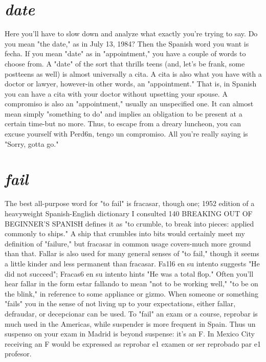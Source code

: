 \section{\emph{date}}

Here you'll have to slow down and analyze what exactly you're
trying to say. Do you mean "the date," as in July 13, 1984? Then the
Spanish word you want is fecha. If you mean "date" as in "appointment," you have a couple of words to choose from. A "date" of the sort
that thrills teens (and, let's be frank, some postteens as well) is almost
universally a cita. A cita is also what you have with a doctor or lawyer, however-in other words, an "appointment." That is, in Spanish
you can have a cita with your doctor without upsetting your spouse. A
compromiso is also an "appointment," usually an unspecified one. It
can almost mean simply "something to do" and implies an obligation
to be present at a certain time-but no more. Thus, to escape from a
dreary luncheon, you can excuse yourself with Perd6n, tengo un compromiso. All you're really saying is "Sorry, gotta go."

\section{\emph{fail}}

The best all-purpose word for "to fail" is fracasar, though one;
1952 edition of a heavyweight Spanish-English dictionary I consulted
140 BREAKING OUT OF BEGINNER'S SPANISH
defines it as "to crumble, to break into pieces: applied commonly to
ships." A ship that crumbles into bits would certainly meet my definition of "failure," but fracasar in common usage covers-much more
ground than that. Fallar is also used for many general senses of "to
fail," though it seems a little kinder and less permanent than fracasar.
Fa1l6 en su intento suggests "He did not succeed"; Fracas6 en su intento hints "He was a total flop." Often you'll hear fallar in the form
estar fallando to mean "not to be working well," "to be on the blink,"
in reference to some appliance or gizmo. When someone or something
"fails" you in the sense of not living up to your expectations, either
fallar, defraudar, or decepcionar can be used. To "fail" an exam or a
course, reprobar is much used in the Americas, while suspender is
more frequent in Spain. Thus un suspenso on your exam in Madrid is
beyond suspense: it's an F. In Mexico City receiving an F would be expressed as reprobar e1 examen or ser reprobado par e1 profesor.

